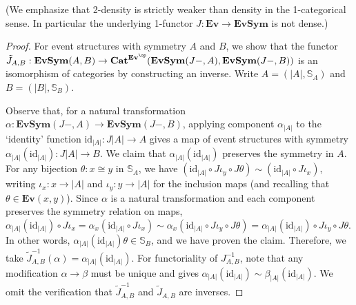 \documentclass[10pt,a4paper]{amsart}
\newcommand{\ES}{\mathbf{Ev}}
\newcommand{\SES}{\mathbf{EvSym}}
\newcommand{\Cat}{\mathbf{Cat}}
\newcommand{\id}{\mathrm{id}}
\begin{document}
(We emphasize that 2-density is strictly weaker than density in the 1-categorical sense. In particular the underlying 1-functor $J : \ES \to \SES$ is not dense.)
\begin{proof}
For event structures with symmetry $A$ and $B$, we show that the functor $\tilde{J}_{A ,B} : \SES(A, B) \to \Cat^{\ES^\op}(\SES(J-, A), \SES(J-, B))$ is an isomorphism of categories by constructing an inverse. Write $A = (|A|, \mathbb{S}_A)$ and $B = (|B|, \mathbb{S}_B)$. 

Observe that, for a natural transformation $\alpha : \SES(J-, A) \to \SES(J-, B)$, applying component $\alpha_{|A|}$ to the `identity' function $\id_{|A|} : J|A| \to A$ gives a map of event structures with symmetry $\alpha_{|A|}(\id_{|A|}) : J|A| \to B$. We claim that $\alpha_{|A|}(\id_{|A|})$ preserves the symmetry in $A$. For any bijection $\theta: x \cong y$ in $\mathbb{S}_A$, we have $(\id_{|A|} \circ J\iota_y \circ J\theta) \sim (\id_{|A|} \circ J\iota_x)$, writing $\iota_x : x \to |A|$ and $\iota_y : y \to |A|$ for the inclusion maps (and recalling that $\theta \in \ES(x, y)$). Since $\alpha$ is a natural transformation and each component preserves the symmetry relation on maps,  $\alpha_{|A|}(\id_{|A|}) \circ J{\iota_x} = \alpha_x (\id_{|A|} \circ J{\iota_x}) \sim \alpha_x(\id_{|A|} \circ J{\iota_y} \circ J\theta) = \alpha_{|A|}(\id_{|A|}) \circ J\iota_y \circ J\theta.$ In other words, $\alpha_{|A|}(\id_{|A|}) \theta \in \mathbb{S}_B$, and we have proven the claim. Therefore, we take $\tilde J_{A, B}^{-1}(\alpha) = \alpha_{|A|}(\id_{|A|})$. For functoriality of $J_{A, B}^{-1}$, note that any modification $\alpha \to \beta$ must be unique and gives $\alpha_{|A|}(\id_{|A|})\sim \beta_{|A|}(\id_{|A|})$. We omit the verification that $\tilde J_{A, B}^{-1}$ and $\tilde J_{A, B}$ are inverses. 
\end{proof}
\end{document}
